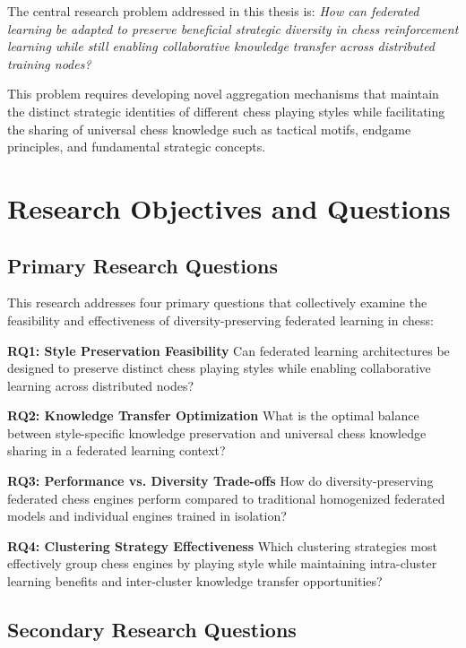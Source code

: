 The central research problem addressed in this thesis is: \textit{How can federated learning be adapted to preserve beneficial strategic diversity in chess reinforcement learning while still enabling collaborative knowledge transfer across distributed training nodes?}

This problem requires developing novel aggregation mechanisms that maintain the distinct strategic identities of different chess playing styles while facilitating the sharing of universal chess knowledge such as tactical motifs, endgame principles, and fundamental strategic concepts.

\section{Research Objectives and Questions}
\label{sec:objectives}

\subsection{Primary Research Questions}
\label{subsec:primary-questions}

This research addresses four primary questions that collectively examine the feasibility and effectiveness of diversity-preserving federated learning in chess:

\textbf{RQ1: Style Preservation Feasibility}
Can federated learning architectures be designed to preserve distinct chess playing styles while enabling collaborative learning across distributed nodes?

\textbf{RQ2: Knowledge Transfer Optimization}
What is the optimal balance between style-specific knowledge preservation and universal chess knowledge sharing in a federated learning context?

\textbf{RQ3: Performance vs. Diversity Trade-offs}
How do diversity-preserving federated chess engines perform compared to traditional homogenized federated models and individual engines trained in isolation?

\textbf{RQ4: Clustering Strategy Effectiveness}
Which clustering strategies most effectively group chess engines by playing style while maintaining intra-cluster learning benefits and inter-cluster knowledge transfer opportunities?

\subsection{Secondary Research Questions}
\label{subsec:secondary-questions}

